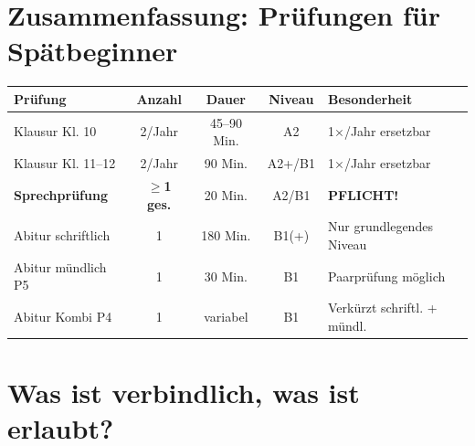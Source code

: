 \documentclass[10pt,a4paper]{article}
\begin{document}

\section{Zusammenfassung: Prüfungen für Spätbeginner}

\begin{center}
\begin{tabular}{|p{3.5cm}|c|c|c|p{4cm}|}
\hline
\rowcolor{spaet}\color{white}\textbf{Prüfung} & \color{white}\textbf{Anzahl} & \color{white}\textbf{Dauer} & \color{white}\textbf{Niveau} & \color{white}\textbf{Besonderheit} \\
\hline
Klausur Kl. 10 & 2/Jahr & 45--90 Min. & A2 & 1$\times$/Jahr ersetzbar \\
\hline
Klausur Kl. 11--12 & 2/Jahr & 90 Min. & A2+/B1 & 1$\times$/Jahr ersetzbar \\
\hline
\textbf{Sprechprüfung} & \textbf{$\geq$1 ges.} & 20 Min. & A2/B1 & \textbf{PFLICHT!} \\
\hline
Abitur schriftlich & 1 & 180 Min. & B1(+) & Nur grundlegendes Niveau \\
\hline
Abitur mündlich P5 & 1 & 30 Min. & B1 & Paarprüfung möglich \\
\hline
Abitur Kombi P4 & 1 & variabel & B1 & Verkürzt schriftl. + mündl. \\
\hline
\end{tabular}
\end{center}

\section{Was ist verbindlich, was ist erlaubt?}
\end{document}
